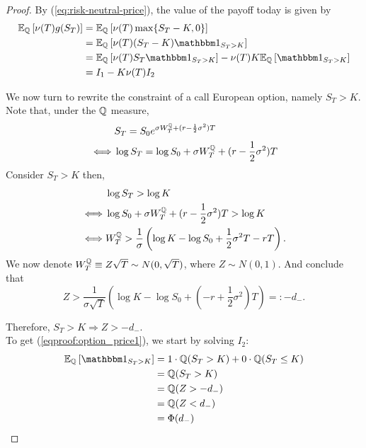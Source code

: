 \documentclass[../TGMAFFIRO.tex]{subfiles}
\begin{document}
\begin{proof}
	By (\ref{eq:risk-neutral-price}), the value of the payoff today is given by
	\begin{align}
		\ExpMeasure{\Qm}{\nu(T)g(S_T)} &= \ExpMeasure{\Qm}{\nu(T)\callPayoff{S_T}} \nonumber \\
		&= \ExpMeasure{\Qm}{\nu(T)(S_T - K)\ind_{S_T > K}} \nonumber\\
		&=\ExpMeasure{\Qm}{\nu(T)S_T\ind_{S_T > K}} - \nu(T)K\ExpMeasure{\Qm}{\ind_{S_T > K}}  \nonumber\\
		&= I_1 - K\nu(T)I_2 \label{eqproof:option_price1}
	\end{align}
	
	We now turn to rewrite the constraint of a call European option, namely $S_T > K$. Note that, under the $\mathbb{Q}$ measure,
	\begin{align*}
		&S_T = S_0e^{\sigma W^{\mathbb{Q}}_T + (r - \frac{1}{2}\sigma^2)T}\\
		\iff &\log S_T = \log S_0 + \sigma W^{\mathbb{Q}}_T + (r - \frac{1}{2}\sigma^2)T
	\end{align*}
	Consider $S_T > K$ then,
	\begin{align*}
		&\log S_T > \log K\\
		\iff & \log S_0 + \sigma W^{\mathbb{Q}}_T + (r - \frac{1}{2}\sigma^2)T > \log K \\
		\iff & W^{\mathbb{Q}}_T  > \frac{1}{\sigma}\left(\log K  - \log S_0 + \frac{1}{2}\sigma^2T - rT\right).
	\end{align*}
	We now denote $W^{\mathbb{Q}}_T \equiv Z\sqrt T \sim N(0, \sqrt{T})$, where $Z\sim N(0,1)$. And conclude that
	\begin{equation}
		Z > \frac{1}{\sigma\sqrt T}\left(\log K  - \log S_0 + \left(-r + \frac{1}{2}\sigma^2\right)T\right) =: -d_-.
	\end{equation}
	
	Therefore, $S_T > K \Rightarrow Z > -d_-$.\\
	
	To get (\ref{eqproof:option_price1}), we start by solving $I_2$:
	\begin{align}
		\ExpMeasure{\Qm}{\ind_{S_T > K}} &= 1 \cdot \Qm(S_T > K) + 0 \cdot \Qm(S_T \leq K) \nonumber\\
		&= \Qm(S_T > K)\nonumber\\
		&= \Qm(Z > -d_-)\nonumber \\
		&= \Qm(Z < d_-)\nonumber \\
		&= \Phi(d_-)
	\end{align}
	

\end{proof}
\end{document}
